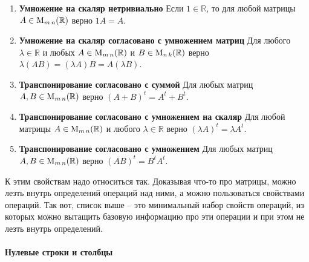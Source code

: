 \begin{enumerate}
\item {\bf Умножение на скаляр нетривиально}
Если $1\in\mathbb R$, то для любой матрицы $A\in \operatorname{M}_{m\,n}(\mathbb R)$ верно $1 A = A$.

\item {\bf Умножение на скаляр согласовано с умножением матриц}
Для любого $\lambda \in \mathbb R$ и любых $A\in\operatorname{M}_{m\,n}(\mathbb R)$ и $B\in\operatorname{M}_{n\,k}(\mathbb R)$ верно $\lambda(AB) = (\lambda A)B = A (\lambda B)$.

\item {\bf Транспонирование согласовано с суммой}
Для любых матриц $A, B\in\operatorname{M}_{m\,n}(\mathbb R)$ верно $(A+B)^t = A^t + B^t$.

\item {\bf Транспонирование согласовано с умножением на скаляр}
Для любой матрицы $A\in\operatorname{M}_{m\,n}(\mathbb R)$ и любого $\lambda\in\mathbb R$ верно $(\lambda A)^t = \lambda A^t$.

\item {\bf Транспонирование согласовано с умножением}
Для любых матриц $A, B\in\operatorname{M}_{m\,n}(\mathbb R)$ верно $(AB)^t = B^t A^t$.
\end{enumerate}

К этим свойствам надо относиться так.
Доказывая что-то про матрицы, можно лезть внутрь определений операций над ними, а можно пользоваться свойствами операций.
Так вот, список выше -- это минимальный набор свойств операций, из которых можно вытащить базовую информацию про эти операции и при этом не лезть внутрь определений.

\paragraph{Нулевые строки и столбцы}

